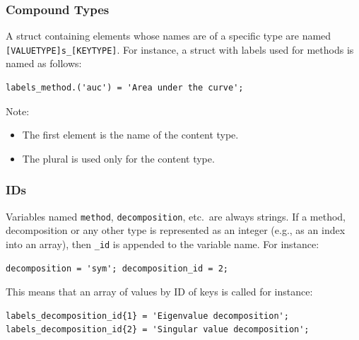 \documentclass{article}
\begin{document}
\subsubsection{Compound Types}

A struct containing elements whose names are of a specific type are
named \texttt{[VALUETYPE]s\_[KEYTYPE]}.  For instance, a struct with
labels used for methods is named as follows:

\begin{verbatim}
labels_method.('auc') = 'Area under the curve';
\end{verbatim}

Note:
\begin{itemize}
\item The first element is the name of the content type.
\item The plural is used only for the content type.
\end{itemize}

\subsubsection{IDs}

Variables named \texttt{method}, \texttt{decomposition}, etc.\ are
always strings.  If a method, decomposition or any other type is
represented as an integer (e.g., as an index into an array), then
\texttt{\_id} is appended to the variable name. For instance:

\begin{verbatim}
decomposition = 'sym'; decomposition_id = 2;
\end{verbatim}

This means that an array of values by ID of keys is called for instance:

\begin{verbatim}
labels_decomposition_id{1} = 'Eigenvalue decomposition';
labels_decomposition_id{2} = 'Singular value decomposition';
\end{verbatim}
\end{document}
